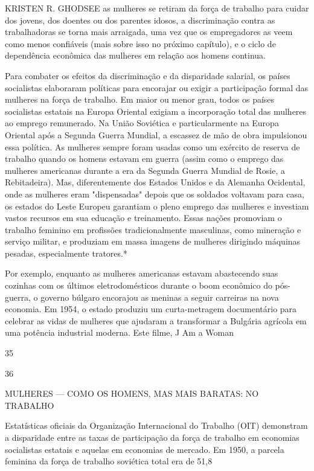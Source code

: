 \par 
KRISTEN R. GHODSEE as mulheres se retiram da força de trabalho para cuidar dos jovens, dos doentes ou dos parentes idosos, a discriminação contra as trabalhadoras se torna mais arraigada, uma vez que os empregadores as veem como menos confiáveis ​​(mais sobre isso no próximo capítulo), e o ciclo de dependência econômica das mulheres em relação aos homens continua.
 \par 
Para combater os efeitos da discriminação e da disparidade salarial, os países socialistas elaboraram políticas para encorajar ou exigir a participação formal das mulheres na força de trabalho. Em maior ou menor grau, todos os países socialistas estatais na Europa Oriental exigiam a incorporação total das mulheres ao emprego remunerado. Na União Soviética e particularmente na Europa Oriental após a Segunda Guerra Mundial, a escassez de mão de obra impulsionou essa política. As mulheres sempre foram usadas como um exército de reserva de trabalho quando os homens estavam em guerra (assim como o emprego das mulheres americanas durante a era da Segunda Guerra Mundial de Rosie, a Rebitadeira). Mas, diferentemente dos Estados Unidos e da Alemanha Ocidental, onde as mulheres eram "dispensadas" depois que os soldados voltavam para casa, os estados do Leste Europeu garantiam o pleno emprego das mulheres e investiam vastos recursos em sua educação e treinamento. Essas nações promoviam o trabalho feminino em profissões tradicionalmente masculinas, como mineração e serviço militar, e produziam em massa imagens de mulheres dirigindo máquinas pesadas, especialmente tratores.*
 \par 
Por exemplo, enquanto as mulheres americanas estavam abastecendo suas cozinhas com os últimos eletrodomésticos durante o boom econômico do pós-guerra, o governo búlgaro encorajou as meninas a seguir carreiras na nova economia. Em 1954, o estado produziu um curta-metragem documentário para celebrar as vidas de mulheres que ajudaram a transformar a Bulgária agrícola em uma potência industrial moderna. Este filme, J Am a Woman
 \par 
35
 \par 
36
 \par 
MULHERES — COMO OS HOMENS, MAS MAIS BARATAS: NO TRABALHO
 \par 
Estatísticas oficiais da Organização Internacional do Trabalho (OIT) demonstram a disparidade entre as taxas de participação da força de trabalho em economias socialistas estatais e aquelas em economias de mercado. Em 1950, a parcela feminina da força de trabalho soviética total era de 51,8%
